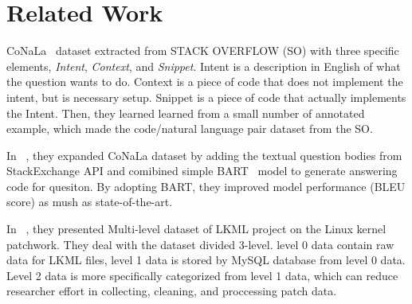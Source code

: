 \section{Related Work}
CoNaLa~\cite{yin2018mining} dataset extracted from STACK OVERFLOW (SO) with three
specific elements, \textit{Intent}, \textit{Context}, and \textit{Snippet}.
Intent is a description in English of what the question wants to do.
Context is a piece of code that does not implement the intent, but is necessary
setup. Snippet is a piece of code that actually implements the Intent. Then, they
learned learned from a small number of annotated example, which made the
code/natural language pair dataset from the SO.

In ~\cite{orlanski2021reading}, they expanded CoNaLa dataset by adding the textual question
bodies from StackExchange API and comibined simple BART~\cite{lewis2019bart}
model to generate answering code for quesiton. By adopting BART, they improved
model performance (BLEU score) as mush as state-of-the-art.

In ~\cite{xu2018kernelpatchwork}, they presented Multi-level dataset of LKML project on the Linux
kernel patchwork. They deal with the dataset divided 3-level. level 0 data
contain raw data for LKML files, level 1 data is stored by MySQL database from
level 0 data. Level 2 data is more specifically categorized from level 1 data,
which can reduce researcher effort in collecting, cleaning, and proccessing
patch data.
